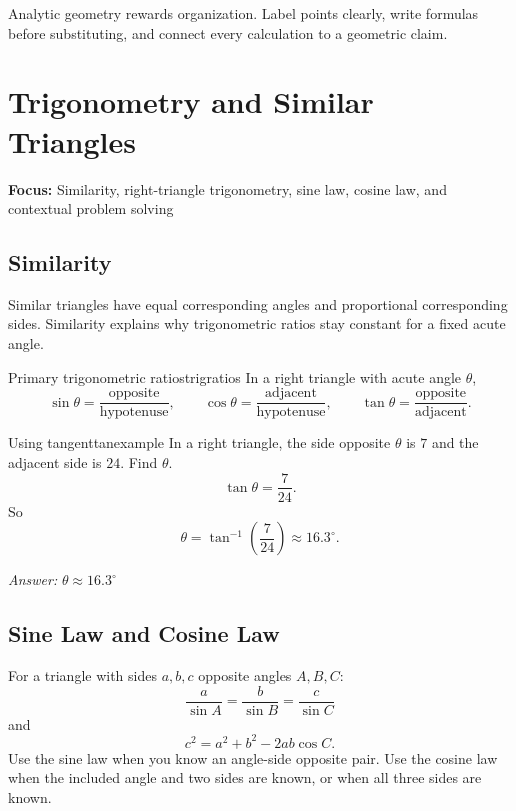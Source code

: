 \documentclass[11pt,oneside]{book}
\newcommand{\topicline}[1]{\medskip\noindent\textbf{Focus:} #1\par\medskip}
\newcommand{\answerline}{\par\smallskip\noindent\textit{Answer: }}
\begin{document}
\begin{summarybox}
Analytic geometry rewards organization. Label points clearly, write formulas before substituting, and connect every calculation to a geometric claim.
\end{summarybox}

\chapter{Trigonometry and Similar Triangles}
\topicline{Similarity, right-triangle trigonometry, sine law, cosine law, and contextual problem solving}

\section{Similarity}
Similar triangles have equal corresponding angles and proportional corresponding sides. Similarity explains why trigonometric ratios stay constant for a fixed acute angle.

\begin{definition}{Primary trigonometric ratios}{trigratios}
In a right triangle with acute angle $\theta$,
\[
\sin\theta=\frac{\text{opposite}}{\text{hypotenuse}}, \qquad
\cos\theta=\frac{\text{adjacent}}{\text{hypotenuse}}, \qquad
\tan\theta=\frac{\text{opposite}}{\text{adjacent}}.
\]
\end{definition}

\begin{example}{Using tangent}{tanexample}
In a right triangle, the side opposite $\theta$ is $7$ and the adjacent side is $24$. Find $\theta$.
\tcblower
\[
\tan\theta=\frac{7}{24}.
\]
So
\[
\theta=\tan^{-1}\!\left(\frac{7}{24}\right)\approx 16.3^\circ.
\]
\answerline $\theta\approx 16.3^\circ$
\end{example}

\section{Sine Law and Cosine Law}
For a triangle with sides $a,b,c$ opposite angles $A,B,C$:
\[
\frac{a}{\sin A}=\frac{b}{\sin B}=\frac{c}{\sin C}
\]
and
\[
c^2=a^2+b^2-2ab\cos C.
\]
Use the sine law when you know an angle-side opposite pair. Use the cosine law when the included angle and two sides are known, or when all three sides are known.
\end{document}
